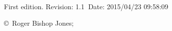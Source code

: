 \begin{centering}

{\footnotesize

First edition. $ $Revision: 1.1 $~$Date: 2015/04/23 09:58:09 $ $

\vspace{0.2in}

\copyright\ Roger Bishop Jones;

}%

\end{centering}
